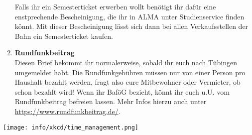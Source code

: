 \begin{enumerate}[label=$\bigcirc$]
		Falls ihr ein Semesterticket erwerben wollt benötigt ihr dafür eine enstprechende Bescheinigung, die ihr in ALMA unter Studienservice finden könnt. Mit dieser Bescheinigung lässt sich dann bei allen Verkaufsstellen der Bahn ein Semesterticket kaufen.
	\item \textbf{Rundfunkbeitrag} \\
		Diesen Brief bekommt ihr normalerweise, sobald ihr euch nach Tübingen umgemeldet habt. Die Rundfunkgebühren müssen nur von einer Person pro Haushalt bezahlt werden, fragt also eure Mitbewohner oder Vermieter, ob schon bezahlt wird! Wenn ihr BaföG bezieht, könnt ihr euch u.U. vom Rundfunkbeitrag befreien lassen. Mehr Infos hierzu auch unter \url{https://www.rundfunkbeitrag.de/}.
  \end{enumerate}

\begin{center}
\texttt{[image: info/xkcd/time\_management.png]}
\end{center}

